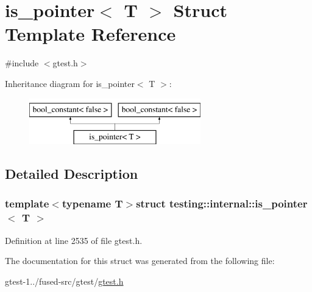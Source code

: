 \hypertarget{structtesting_1_1internal_1_1is__pointer}{\section{is\-\_\-pointer$<$ \-T $>$ \-Struct \-Template \-Reference}
\label{de/d83/structtesting_1_1internal_1_1is__pointer}
}


{\ttfamily \#include $<$gtest.\-h$>$}

\-Inheritance diagram for is\-\_\-pointer$<$ \-T $>$\-:\begin{figure}[H]
\begin{center}
\leavevmode
\includegraphics[height=2.000000cm]{de/d83/structtesting_1_1internal_1_1is__pointer}
\end{center}
\end{figure}


\subsection{\-Detailed \-Description}
\subsubsection*{template$<$typename T$>$struct testing\-::internal\-::is\-\_\-pointer$<$ T $>$}



\-Definition at line 2535 of file gtest.\-h.



\-The documentation for this struct was generated from the following file\-:\begin{DoxyCompactItemize}
\item 
gtest-\/1../fused-\/src/gtest/\hyperlink{fused-src_2gtest_2gtest_8h}{gtest.\-h}\end{DoxyCompactItemize}
